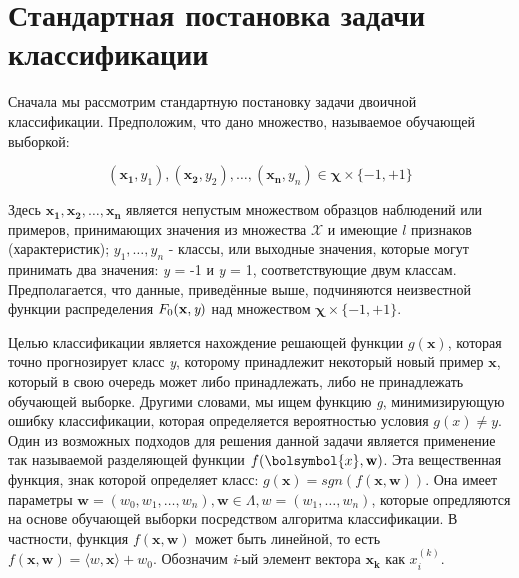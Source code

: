 \documentclass[12pt,a4paper,oneside]{article}
\begin{document}

\section{Стандартная постановка задачи классификации}
\label{sec:standard_classification_problem}


\par
Сначала мы рассмотрим стандартную постановку задачи двоичной классификации.
Предположим, что дано множество, называемое обучающей выборкой:

\[
(\mathbf{x_1}, y_1),(\mathbf{x_2}, y_2), \dots, (\mathbf{x_n}, y_n) \in \mathbf{\chi} \times \{-1,+1\}
\]


\par
Здесь \(\mathbf{x_1}, \mathbf{x_2}, \dots, \mathbf{x_n}\) является непустым множеством образцов наблюдений или примеров, принимающих значения из множества \(\mathcal{X}\) и имеющие $l$ признаков (характеристик); \(y_1, \dots, y_n\) - классы, или выходные значения, которые могут принимать два значения: \emph{y} = -1 и \emph{y} = 1, соответствующие двум классам. 
Предполагается, что данные, приведённые выше, подчиняются неизвестной функции распределения \(F_0(\mathbf{x}, \emph{y})\) над множеством \(\mathbf{\chi} \times \{-1, +1\}\). 


\par
Целью классификации является нахождение решающей функции \(g(\mathbf{x})\), которая точно прогнозирует класс \emph{y}, которому принадлежит некоторый новый пример \(\mathbf{x}\), который в свою очередь может либо принадлежать, либо не принадлежать обучающей выборке. 
Другими словами, мы ищем функцию \emph{g}, минимизирующую ошибку классификации, которая определяется вероятностью условия \(g(x) \neq y\). 
Один из возможных подходов для решения данной задачи является применение так называемой разделяющей функции \(f(\bolsymbol{x}, \mathbf{w})\). 
Эта вещественная функция, знак которой определяет класс: \(g(\mathbf{x})=sgn(f(\mathbf{x}, \mathbf{w}))\).
Она имеет параметры \(\mathbf{w}=(w_0, w_1, \dots, w_n), \mathbf{w} \in \Lambda, w = (w_1, \dots, w_n)\), которые опредляются на основе обучающей выборки посредством алгоритма классификации. 
В частности, функция \(f(\mathbf{x}, \mathbf{w})\) может быть линейной, то есть \(f(\mathbf{x}, \mathbf{w}) = \langle w, \mathbf{x} \rangle + w_0\). 
Обозначим \emph{i}-ый элемент вектора \(\mathbf{x_k}\) как \(x_i^{(k)}\). 
\end{document}
